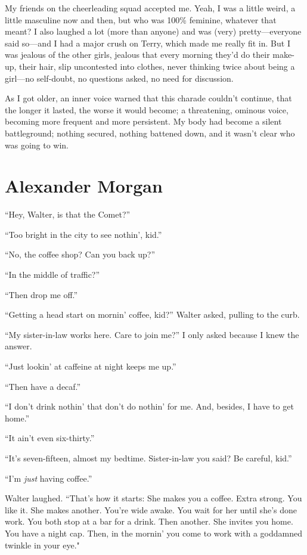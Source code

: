 My friends on the cheerleading squad accepted me. Yeah, I was a little
weird, a little masculine now and then, but who was 100\% feminine,
whatever that meant? I also laughed a lot (more than anyone) and was
(very) pretty---everyone said so---and I had a major crush on Terry,
which made me really fit in. But I was jealous of the other girls,
jealous that every morning they'd do their make-up, their hair, slip
uncontested into clothes, never thinking twice about being a girl---no
self-doubt, no questions asked, no need for discussion.

As I got older, an inner voice warned that this charade couldn't
continue, that the longer it lasted, the worse it would become; a
threatening, ominous voice, becoming more frequent and more persistent.
My body had become a silent battleground; nothing secured, nothing
battened down, and it wasn't clear who was going to win.

\chapter{Alexander Morgan}

\titlemark

``Hey, Walter, is that the Comet?''

``Too bright in the city to see nothin', kid.''

``No, the coffee shop? Can you back up?''

``In the middle of traffic?''

``Then drop me off.''

``Getting a head start on mornin' coffee, kid?'' Walter asked, pulling
to the curb.

``My sister-in-law works here. Care to join me?'' I only asked because I
knew the answer.

``Just lookin' at caffeine at night keeps me up.''

``Then have a decaf.''

``I don't drink nothin' that don't do nothin' for me. And, besides, I
have to get home.''

``It ain't even six-thirty.''

``It's seven-fifteen, almost my bedtime. Sister-in-law you said? Be
careful, kid.''

``I'm \emph{just} having coffee.''

Walter laughed. ``That's how it starts: She makes you a coffee. Extra
strong. You like it. She makes another. You're wide awake. You wait for
her until she's done work. You both stop at a bar for a drink. Then
another. She invites you home. You have a night cap. Then, in the
mornin' you come to work with a goddamned twinkle in your eye."

